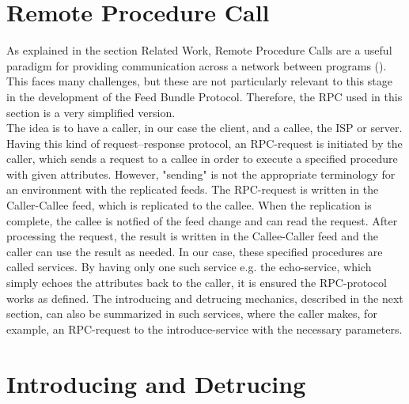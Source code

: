 \pagebreak
\section{Remote Procedure Call}
As explained in the section Related Work, Remote Procedure Calls are a useful paradigm for providing communication across a
network between programs (\citet{birrell1984implementing}). This faces many challenges, but these are not particularly relevant to this stage in the development of the Feed Bundle Protocol. Therefore, the RPC used in this section is a very simplified version.\\
The idea is to have a caller, in our case the client, and a callee, the ISP or server. Having this kind of request–response protocol, an RPC-request is initiated by the caller, which sends a request to a callee in order to execute a specified procedure with given attributes. However, "sending" is not the appropriate terminology for an environment with the replicated feeds. The RPC-request is written in the Caller-Callee feed, which is replicated to the callee. When the replication is complete, the callee is notfied of the feed change and can read the request. After processing the request, the result is written in the Callee-Caller feed and the caller can use the result as needed. In our case, these specified procedures are called services. By having only one such service e.g. the echo-service, which simply echoes the attributes back to the caller, it is ensured the RPC-protocol works as defined. The introducing and detrucing mechanics, described in the next section, can also be summarized in such services, where the caller makes, for example, an RPC-request to the introduce-service with the necessary parameters. 

\section{Introducing and Detrucing}
